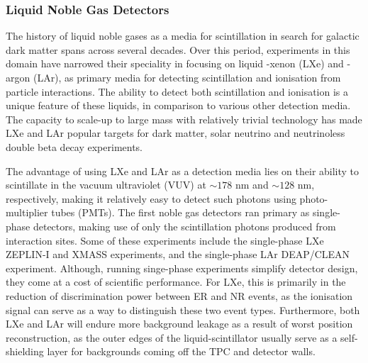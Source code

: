 {\subsubsection{Liquid Noble Gas Detectors}
\label{subsec:liquid_noble_gas}

The history of liquid noble gases as a media for scintillation in search for galactic dark matter spans across several decades. Over this period, experiments in this domain have narrowed their speciality in focusing on liquid -xenon (LXe) and -argon (LAr), as primary media for detecting scintillation and ionisation from particle interactions. The ability to detect both scintillation and ionisation is a unique feature of these liquids, in comparison to various other detection media. The capacity to scale-up to large mass with relatively trivial technology has made LXe and LAr popular targets for dark matter, solar neutrino and neutrinoless double beta decay experiments. 

The advantage of using LXe and LAr as a detection media lies on their ability to scintillate in the vacuum ultraviolet (VUV) at $\sim178$ nm and $\sim128$ nm, respectively, making it relatively easy to detect such photons using photo-multiplier tubes (PMTs). The first noble gas detectors ran primary as single-phase detectors, making use of only the scintillation photons produced from interaction sites. Some of these experiments include the single-phase LXe ZEPLIN-I \cite{zeplin_1} and XMASS \cite{xmass} experiments, and the single-phase LAr DEAP/CLEAN \cite{deap} experiment. Although, running singe-phase experiments simplify detector design, they come at a cost of scientific performance. For LXe, this is primarily in the reduction of discrimination power between ER and NR events, as the ionisation signal can serve as a way to distinguish these two event types. Furthermore, both LXe and LAr will endure more background leakage as a result of worst position reconstruction, as the outer edges of the liquid-scintillator usually serve as a self-shielding layer for backgrounds coming off the TPC and detector walls.

}
